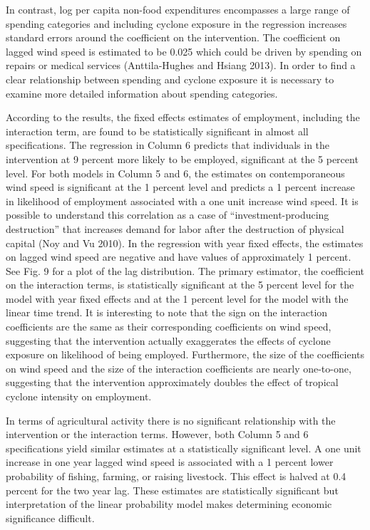 \documentclass[12pt]{article}
\begin{document}
	In contrast, log per capita non-food expenditures encompasses a large range of spending categories and including cyclone exposure in the regression increases standard errors around the coefficient on the intervention. The coefficient on lagged wind speed is estimated to be 0.025 which could be driven by spending on repairs or medical services (Anttila-Hughes and Hsiang 2013). In order to find a clear relationship between spending and cyclone exposure it is necessary to examine more detailed information about spending categories. 

	According to the results, the fixed effects estimates of employment, including the interaction term, are found to be statistically significant in almost all specifications. The regression in Column 6 predicts that individuals in the intervention at 9 percent more likely to be employed, significant at the 5 percent level. For both models in Column 5 and 6, the estimates on contemporaneous wind speed is significant at the 1 percent level and predicts a 1 percent increase in likelihood of employment associated with a one unit increase wind speed. It is possible to understand this correlation as a case of ``investment-producing destruction'' that increases demand for labor after the destruction of physical capital (Noy and Vu 2010). In the regression with year fixed effects, the estimates on lagged wind speed are negative and have values of approximately 1 percent. See Fig. 9 for a plot of the lag distribution. The primary estimator, the coefficient on the interaction terms, is statistically significant at the 5 percent level for the model with year fixed effects and at the 1 percent level for the model with the linear time trend. It is interesting to note that the sign on the interaction coefficients are the same as their corresponding coefficients on wind speed, suggesting that the intervention actually exaggerates the effects of cyclone exposure on likelihood of being employed. Furthermore, the size of the coefficients on wind speed and the size of the interaction coefficients are nearly one-to-one, suggesting that the intervention approximately doubles the effect of tropical cyclone intensity on employment.  

	In terms of agricultural activity there is no significant relationship with the intervention or the interaction terms. However, both Column 5 and 6 specifications yield similar estimates at a statistically significant level. A one unit increase in one year lagged wind speed is associated with a 1 percent lower probability of fishing, farming, or raising livestock. This effect is halved at 0.4 percent for the two year lag. These estimates are statistically significant but interpretation of the linear probability model makes determining economic significance difficult.
\end{document}
